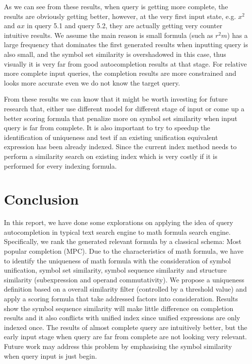 \documentclass[12pt]{article} %
\begin{document}
As we can see from these results, when query is getting more complete, the results are obviously
getting better, however, at the very first input state, e.g. $x^2$ and $ax$ in query 5.1 and query 5.2, they are actually getting very counter intuitive results.
We assume the main reason is small formula (such as $r^2m$) has a large frequency that dominates the
first generated results when inputting query is also small, and the symbol set similarity is overshadowed in this case, thus visually it is very far from good autocompletion results at that stage.
For relative more complete input queries, the completion results are more constrained and looks more accurate even we do not know the target query.

From these results we can know that it might be worth investing for future research that,
either use different model for different stage of input or come up a better scoring formula that
penalize more on symbol set similarity when input query is far from complete.
It is also important to try to speedup the identification of uniqueness and test if an existing unification equivalent expression has been already indexed. Since the current index method needs to perform a similarity search on existing index which is very costly if it is performed for every indexing formula.

\section{Conclusion}
In this report, we have done some explorations on applying the idea of query autocompletion in
typical text search engine to math formula search engine.
Specifically, we rank the generated relevant formula by a classical schema: Most popular completion (MPC).
Due to the characteristics of math formula, we have to identify the uniqueness of math formula with the consideration of symbol unification, symbol set similarity, symbol sequence similarity and structure similarity (subexpression and operand commutativity).
We propose a uniqueness definition based on a overall similarity filter (controlled by a threshold value) and apply a scoring formula that take addressed factors into consideration. 
Results show the symbol sequence similarity will make little difference on completion results and it
also conflicts with unified index since unified expressions are only indexed once.
The results of almost complete query are intuitively better, but the early input stage when query are
far from complete are not looking very relevant. Future work may address this problem by emphasising the symbol similarity when query input is just begin.
{}

\end{document}
